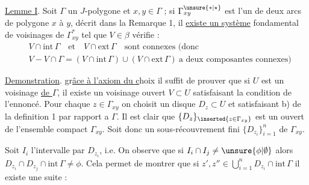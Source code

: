 %
\uline{Lemme I}. Soit $\Gamma$ un $J$-polygone et $x,y\in\Gamma$  ; si $\Gamma^{\unsure{*|\star}}_{xy}$ est l'un de deux arcs de polygone  $x$ à $y$, décrit dans la Remarque 1, il \uline{existe un système} fondamental  de voisinages \deleted{$\beta$}  de $\Gamma^{*}_{xy}$ tel que $V\in\beta$ vérifie :
\margin{$\cdot$}
\[
\begin{aligned}
&V\cap\mathrm{int}\,\Gamma\quad\text{et}\quad V\cap\mathrm{ext}\,\Gamma\quad\text{sont connexes (donc}\\
&V-V\cap\Gamma=(V\cap\mathrm{int}\,\Gamma)\cup(V\cap\mathrm{ext}\,\Gamma)\ \text{a deux composantes connexes)}
\end{aligned}
\]

\margin{!}\uline{Demonstration}. gr\uline{âce à l'axiom du c}hoix il suffit de prouver que si $U$ est un voisinage \uline{de $\Gamma$}, il existe un voisinage ouvert $V\subset U$ satisfaisant  la condition de l'ennoncé. Pour chaque $z\in\Gamma_{xy}$ on choisit un disque  $D_{z}\subset U$ et satisfaisant b) de la definition 1 par rapport a $\Gamma$. Il est clair que $\{D_{z}\}_{\inserted{z\in\Gamma_{xy}}}$ est un  ouvert de l'ensemble compact $\Gamma_{xy}$. Soit donc un sous-récouvrement fini $\{D_{z_{i}}\}^{n}_{i=1}$ de $\Gamma_{xy}$.

Soit $I_{i}$ l'intervalle   par $D_{z_{i}}$, i.e.  On observe que si $I_{i}\cap I_{j}\ne\unsure{\phi|\emptyset}$ alors $D_{z_{i}}\cap D_{z_{j}}\cap\mathrm{int}\,\Gamma\ne\phi$. Cela permet de montrer que si $z',z''\in\bigcup\limits_{i=1}^{n}D_{z_{i}}\cap\mathrm{int}\,\Gamma$ il existe une suite :


